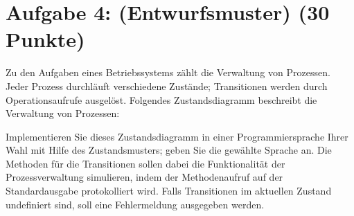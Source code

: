 \documentclass{article}
\begin{document}
\section{Aufgabe 4: (Entwurfsmuster) (30 Punkte)}

Zu den Aufgaben eines Betriebssystems zählt die Verwaltung von
Prozessen. Jeder Prozess durchläuft verschiedene Zustände; Transitionen
werden durch Operationsaufrufe ausgelöst. Folgendes Zustandsdiagramm
beschreibt die Verwaltung von Prozessen:

\begin{center}
\end{center}

\noindent
Implementieren Sie dieses Zustandsdiagramm in einer Programmiersprache
Ihrer Wahl mit Hilfe des Zustandsmusters; geben Sie die gewählte Sprache
an. Die Methoden für die Transitionen sollen dabei die Funktionalität
der Prozessverwaltung simulieren, indem der Methodenaufruf auf der
Standardausgabe protokolliert wird. Falls Transitionen im aktuellen
Zustand undefiniert sind, soll eine Fehlermeldung ausgegeben werden.
\end{document}
